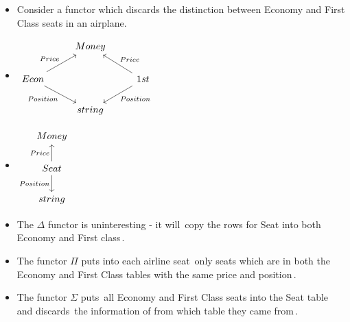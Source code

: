 \begin{itemize}
    \item Consider a functor which discards the distinction between Economy and First Class seats in an airplane.
    \item $\begin{tikzcd} & Money & \\ Econ \arrow[ru, "Price"] \arrow[rd, "Position"'] & & 1st \arrow[lu, "Price"'] \arrow[ld, "Position"] \\ & string & \end{tikzcd}$
    \item $\begin{tikzcd} Money \\ Seat \arrow[u, "Price"] \arrow[d, "Position"'] \\ string \end{tikzcd}$
    \item The $\Delta$ functor is uninteresting - it will \,copy the rows for Seat into both Economy and First class\,.
    \item The functor $\Pi$ puts into each airline seat \,only seats which are in both the Economy and First Class tables with the same price and position\,.
    \item The functor $\Sigma$ puts \,all Economy and First Class seats into the Seat table\, and discards \,the information of from which table they came from\,.
  \end{itemize}
